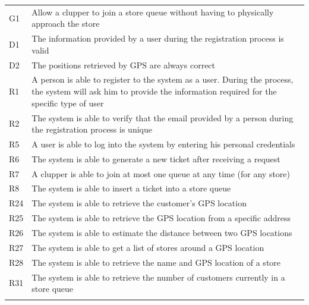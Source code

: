 \begin{longtable}[]{@{}
  >{\raggedright\arraybackslash}p{}
  >{\raggedright\arraybackslash}p{}@{}}
\toprule
G1 & Allow a clupper to join a store queue without having to physically
approach the store \\ \addlinespace
\midrule
\endhead
D1 & The information provided by a user during the registration process
is valid \\ \addlinespace
D2 & The positions retrieved by GPS are always correct \\ \addlinespace
R1 & A person is able to register to the system as a user. During the
process, the system will ask him to provide the information required for
the specific type of user \\ \addlinespace
R2 & The system is able to verify that the email provided by a person
during the registration process is unique \\ \addlinespace
R5 & A user is able to log into the system by entering his personal
credentials \\ \addlinespace
R6 & The system is able to generate a new ticket after receiving a
request \\ \addlinespace
R7 & A clupper is able to join at most one queue at any time (for any
store) \\ \addlinespace
R8 & The system is able to insert a ticket into a store
queue \\ \addlinespace
R24 & The system is able to retrieve the customer's GPS
location \\ \addlinespace
R25 & The system is able to retrieve the GPS location from a specific
address \\ \addlinespace
R26 & The system is able to estimate the distance between two GPS
locations \\ \addlinespace
R27 & The system is able to get a list of stores around a GPS
location \\ \addlinespace
R28 & The system is able to retrieve the name and GPS location of a
store \\ \addlinespace
R31 & The system is able to retrieve the number of customers currently
in a store queue \\ \addlinespace
\bottomrule
\end{longtable}

